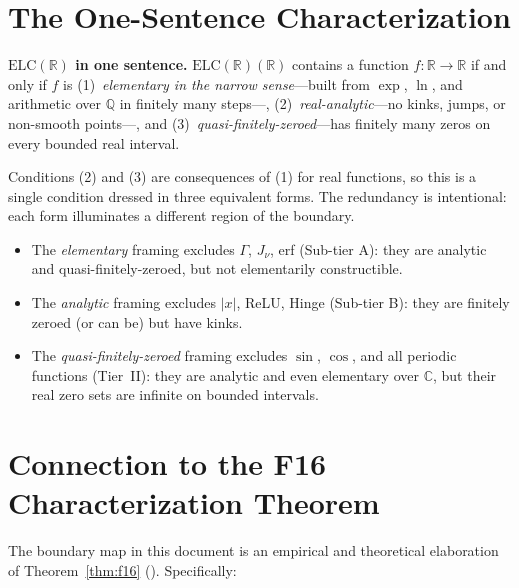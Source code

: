\documentclass[12pt,a4paper]{article}
\theoremstyle{definition}
\newcommand{\ELC}{\mathrm{ELC}(\mathbb{R})}
\newcommand{\R}{\mathbb{R}}
\newcommand{\C}{\mathbb{C}}
\newcommand{\Q}{\mathbb{Q}}
\begin{document}
\begin{enumerate}[label=\textbf{Ring \arabic*:}, leftmargin=*, itemsep=10pt]
\end{enumerate}

\section{The One-Sentence Characterization}
\label{sec:sentence}

\begin{mdframed}
\textbf{$\ELC$ in one sentence.}
$\ELC(\R)$ contains a function $f:\R\to\R$ if and only if $f$ is
(1)~\emph{elementary in the narrow sense}---built from
$\exp$, $\ln$, and arithmetic over $\Q$ in finitely many steps---,
(2)~\emph{real-analytic}---no kinks, jumps, or non-smooth points---,
and (3)~\emph{quasi-finitely-zeroed}---has finitely many zeros on every
bounded real interval.
\end{mdframed}

Conditions (2) and (3) are consequences of (1) for real functions, so this
is a single condition dressed in three equivalent forms.
The redundancy is intentional: each form illuminates a different region of
the boundary.

\begin{itemize}
  \item The \emph{elementary} framing excludes $\Gamma$, $J_\nu$, erf
    (Sub-tier A): they are analytic and quasi-finitely-zeroed, but not
    elementarily constructible.
  \item The \emph{analytic} framing excludes $|x|$, ReLU, Hinge
    (Sub-tier B): they are finitely zeroed (or can be) but have kinks.
  \item The \emph{quasi-finitely-zeroed} framing excludes $\sin$, $\cos$,
    and all periodic functions (Tier~II): they are analytic and even
    elementary over $\C$, but their real zero sets are infinite on bounded
    intervals.
\end{itemize}

\section{Connection to the F16 Characterization Theorem}
\label{sec:connection}

The boundary map in this document is an empirical and theoretical elaboration
of Theorem~\ref{thm:f16} (\cite{F16}).  Specifically:
\end{document}
